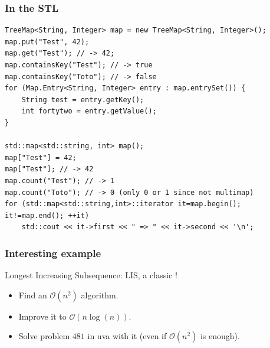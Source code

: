 \documentclass[10pt,svgnames,usenames,table]{beamer} %
\newcommand{\bigoh}{\mathcal{O}}
\begin{document}
\begin{frame}[fragile]
  \frametitle{In the STL}
  \begin{lstlisting}
TreeMap<String, Integer> map = new TreeMap<String, Integer>();
map.put("Test", 42);
map.get("Test"); // -> 42;
map.containsKey("Test"); // -> true
map.containsKey("Toto"); // -> false
for (Map.Entry<String, Integer> entry : map.entrySet()) {
    String test = entry.getKey();
    int fortytwo = entry.getValue();
}

std::map<std::string, int> map();
map["Test"] = 42;
map["Test"]; // -> 42
map.count("Test"); // -> 1
map.count("Toto"); // -> 0 (only 0 or 1 since not multimap)
for (std::map<std::string,int>::iterator it=map.begin(); it!=map.end(); ++it)
    std::cout << it->first << " => " << it->second << '\n';
  \end{lstlisting}
\end{frame}

\begin{frame}
  \frametitle{Interesting example}
  Longest Increasing Subsequence: LIS, a classic !
  \begin{itemize}
    \item Find an $\bigoh(n^2)$ algorithm.
    \item Improve it to $\bigoh(n\log(n))$.
    \item Solve problem $481$ in uva with it (even if $\bigoh(n^2)$ is enough).
  \end{itemize}
\end{frame}
\end{document}
